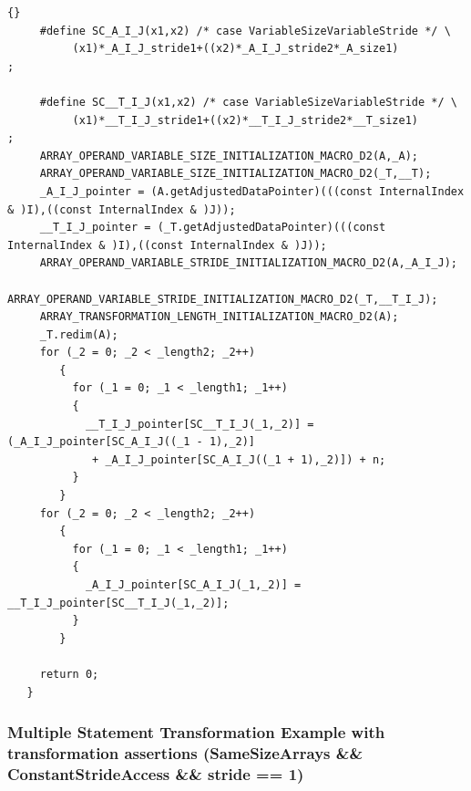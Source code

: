 \documentclass[10pt]{article}
\begin{document}
{\begin{lstlisting}{}
     #define SC_A_I_J(x1,x2) /* case VariableSizeVariableStride */ \
          (x1)*_A_I_J_stride1+((x2)*_A_I_J_stride2*_A_size1)
; 
        
     #define SC__T_I_J(x1,x2) /* case VariableSizeVariableStride */ \
          (x1)*__T_I_J_stride1+((x2)*__T_I_J_stride2*__T_size1)
; 
     ARRAY_OPERAND_VARIABLE_SIZE_INITIALIZATION_MACRO_D2(A,_A); 
     ARRAY_OPERAND_VARIABLE_SIZE_INITIALIZATION_MACRO_D2(_T,__T); 
     _A_I_J_pointer = (A.getAdjustedDataPointer)(((const InternalIndex & )I),((const InternalIndex & )J)); 
     __T_I_J_pointer = (_T.getAdjustedDataPointer)(((const InternalIndex & )I),((const InternalIndex & )J)); 
     ARRAY_OPERAND_VARIABLE_STRIDE_INITIALIZATION_MACRO_D2(A,_A_I_J); 
     ARRAY_OPERAND_VARIABLE_STRIDE_INITIALIZATION_MACRO_D2(_T,__T_I_J); 
     ARRAY_TRANSFORMATION_LENGTH_INITIALIZATION_MACRO_D2(A); 
     _T.redim(A); 
     for (_2 = 0; _2 < _length2; _2++)
        { 
          for (_1 = 0; _1 < _length1; _1++)
          { 
            __T_I_J_pointer[SC__T_I_J(_1,_2)] = (_A_I_J_pointer[SC_A_I_J((_1 - 1),_2)]
             + _A_I_J_pointer[SC_A_I_J((_1 + 1),_2)]) + n; 
          } 
        } 
     for (_2 = 0; _2 < _length2; _2++)
        { 
          for (_1 = 0; _1 < _length1; _1++)
          { 
            _A_I_J_pointer[SC_A_I_J(_1,_2)] = __T_I_J_pointer[SC__T_I_J(_1,_2)]; 
          } 
        } 

     return 0;
   } 

\end{lstlisting}
}

\subsubsection{Multiple Statement Transformation Example with transformation assertions (SameSizeArrays \&\& ConstantStrideAccess \&\& stride == 1)}
\end{document}
